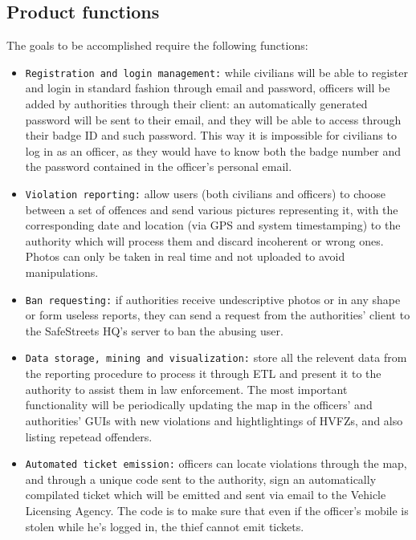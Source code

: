 \documentclass[12pt,a4paper]{article}
\begin{document}
\subsection{Product	functions}
The goals to be accomplished require the following functions:
 \begin{itemize}
\item \texttt{Registration and login management:} while civilians will be able to register and login in standard fashion through email and password, officers will be added by authorities through their client: an automatically generated password will be sent to their email, and they will be able to access through their badge ID and such password. This way it is impossible for civilians to log in as an officer, as they would have to know both the badge number and the password contained in the officer's personal email.

\item \texttt{Violation reporting:} allow users (both civilians and officers) to choose between a set of offences and send various pictures representing it, with the corresponding date and location (via GPS and system timestamping) to the authority which will process them and discard incoherent or wrong ones. Photos can only be taken in real time and not uploaded to avoid manipulations.

\item \texttt{Ban requesting:} if authorities receive undescriptive photos or in any shape or form useless reports, they can send a request from the authorities' client to the SafeStreets HQ's server to ban the abusing user.

\item  \texttt{Data storage, mining and visualization:} store all the relevent data from the reporting procedure to process it through ETL and present it to the authority to assist them in law enforcement. The most important functionality will be periodically updating the map in the officers' and authorities' GUIs with new violations and hightlightings of HVFZs, and also listing repetead offenders. 

\item  \texttt{Automated ticket emission:} officers can locate violations through the map, and through a unique code sent to the authority, sign an automatically compilated ticket which will be emitted and sent via email to the Vehicle Licensing Agency. The code is to make sure that even if the officer's mobile is stolen while he's logged in, the thief cannot emit tickets.
\end{itemize}
\end{document}
